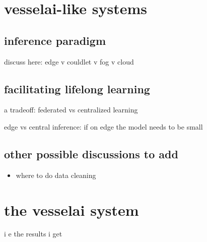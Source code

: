 %
%





\chapter{vesselai-like systems}

\section{inference paradigm}

discuss here: edge v couldlet v fog v cloud


\section{facilitating lifelong learning}

a tradeoff: federated vs centralized learning \cite{iotsurvey}

edge vs central inference: if on edge the model needs to be small \cite{iotsurvey}

\section{other possible discussions to add}

\begin{itemize}
    \item where to do data cleaning
\end{itemize}

\chapter{the vesselai system}

i e the results i get
